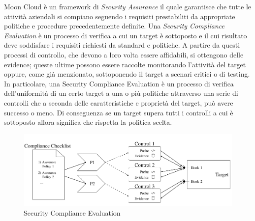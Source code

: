 Moon Cloud è un framework di \textit{Security Assurance} il quale garantisce che tutte le attività aziendali si compiano seguendo i requisiti 
prestabiliti da appropriate politiche e procedure precedentemente definite.
Una \textit{Security Compliance Evaluation} è un processo di verifica a cui un target è sottoposto e il cui risultato 
deve soddisfare i requisiti richiesti da standard e politiche. A partire da questi processi di controllo, che devono a loro volta essere 
affidabili, si ottengono delle evidence; queste ultime possono essere raccolte monitorando l'attività del target oppure, come già 
menzionato, sottoponendo il target a scenari critici o di testing.\hfill\break
In particolare, una Security Compliance Evaluation è un processo di verifica dell'uniformità di un certo target a una o più politiche 
attraverso una serie di controlli che a seconda delle caratteristiche e proprietà del target, può avere successo o meno. Di 
conseguenza se un target supera tutti i controlli a cui è sottoposto allora significa che rispetta la politica scelta.
\begin{figure}[ht!]
    \includegraphics[scale=0.5]{images/Security_Compliance_Evaluation.png}
    \caption{Security Compliance Evaluation}
    \label{fig:Security_Compliance_Evaluation}
\end{figure}
%

